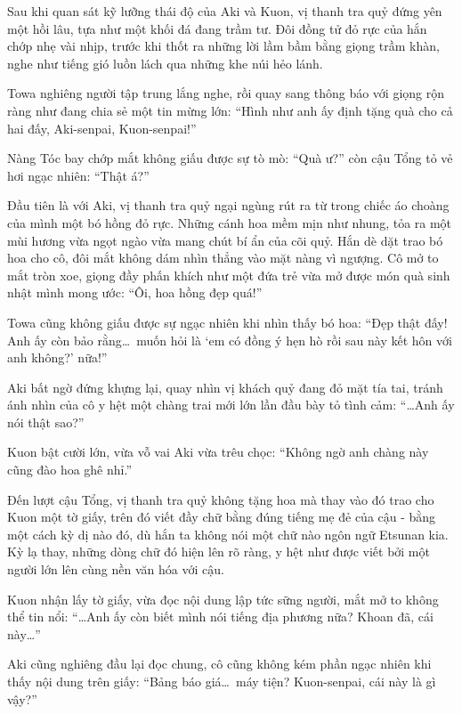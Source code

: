 \documentclass[../main.tex]{subfiles}
\begin{document}
\ct

Sau khi quan sát kỹ lưỡng thái độ của Aki và Kuon, vị thanh tra quỷ đứng yên một hồi lâu, tựa như một khối đá đang trầm tư. Đôi đồng tử đỏ rực của hắn chớp nhẹ vài nhịp, trước khi thốt ra những lời lầm bầm bằng giọng trầm khàn, nghe như tiếng gió luồn lách qua những khe núi hẻo lánh.

Towa nghiêng người tập trung lắng nghe, rồi quay sang thông báo với giọng rộn ràng như đang chia sẻ một tin mừng lớn: ``Hình như anh ấy định tặng quà cho cả hai đấy, Aki-senpai, Kuon-senpai!''

Nàng Tóc bay chớp mắt không giấu được sự tò mò: ``Quà ư?'' còn cậu Tổng tỏ vẻ hơi ngạc nhiên: ``Thật á?''

Đầu tiên là với Aki, vị thanh tra quỷ ngại ngùng rút ra từ trong chiếc áo choàng của mình một bó hồng đỏ rực. Những cánh hoa mềm mịn như nhung, tỏa ra một mùi hương vừa ngọt ngào vừa mang chút bí ẩn của cõi quỷ. Hắn dè dặt trao bó hoa cho cô, đôi mắt không dám nhìn thẳng vào mặt nàng vì ngượng. Cô mở to mắt tròn xoe, giọng đầy phấn khích như một đứa trẻ vừa mở được món quà sinh nhật mình mong ước: ``Ôi, hoa hồng đẹp quá!''


Towa cũng không giấu được sự ngạc nhiên khi nhìn thấy bó hoa: ``Đẹp thật đấy! Anh ấy còn bảo rằng\dots\ muốn hỏi là `em có đồng ý hẹn hò rồi sau này kết hôn với anh không?' nữa!''

Aki bất ngờ đứng khựng lại, quay nhìn vị khách quỷ đang đỏ mặt tía tai, tránh ánh nhìn của cô y hệt một chàng trai mới lớn lần đầu bày tỏ tình cảm: ``\dots Anh ấy nói thật sao?''

Kuon bật cười lớn, vừa vỗ vai Aki vừa trêu chọc: ``Không ngờ anh chàng này cũng đào hoa ghê nhỉ.''

Đến lượt cậu Tổng, vị thanh tra quỷ không tặng hoa mà thay vào đó trao cho Kuon một tờ giấy, trên đó viết đầy chữ bằng đúng tiếng mẹ đẻ của cậu - bằng một cách kỳ dị nào đó, dù hắn ta không nói một chữ nào ngôn ngữ Etsunan kia. Kỳ lạ thay, những dòng chữ đó hiện lên rõ ràng, y hệt như được viết bởi một người lớn lên cùng nền văn hóa với cậu.

Kuon nhận lấy tờ giấy, vừa đọc nội dung lập tức sững người, mắt mở to không thể tin nổi: ``\dots Anh ấy còn biết mình nói tiếng địa phương nữa? Khoan đã, cái này\dots''

Aki cũng nghiêng đầu lại đọc chung, cô cũng không kém phần ngạc nhiên khi thấy nội dung trên giấy: ``Bảng báo giá\dots\ máy tiện? Kuon-senpai, cái này là gì vậy?''
\end{document}
